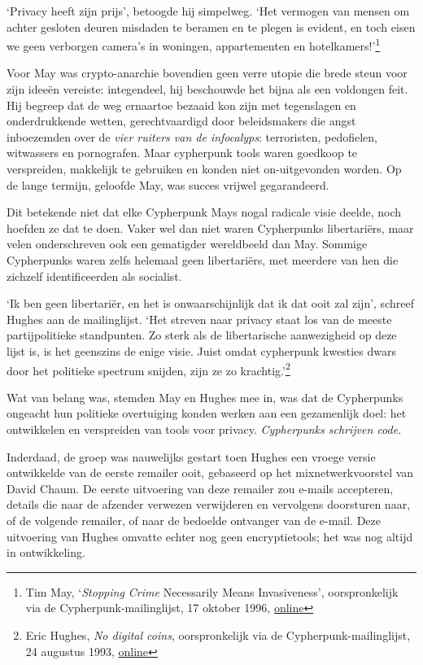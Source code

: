 \documentclass[
  a5paper,
  smalldemyvopaper,11pt,twoside,onecolumn,openright,extrafontsizes,
hidelinks]{memoir}
\begin{document}
`Privacy heeft zijn prijs', betoogde hij simpelweg. `Het vermogen van
mensen om achter gesloten deuren misdaden te beramen en te plegen is
evident, en toch eisen we geen verborgen camera's in woningen,
appartementen en hotelkamers!'\footnote{Tim May, `\emph{Stopping Crime}
  Necessarily Means Invasiveness', oorspronkelijk via de
  Cypherpunk-mailinglijst, 17 oktober 1996,
  \href{https://cypherpunks.venona.com/date/1996/10/msg01269.html}{online}}

Voor May was crypto-anarchie bovendien geen verre utopie die brede steun
voor zijn ideeën vereiste: integendeel, hij beschouwde het bijna als een
voldongen feit. Hij begreep dat de weg ernaartoe bezaaid kon zijn met
tegenslagen en onderdrukkende wetten, gerechtvaardigd door beleidsmakers
die angst inboezemden over de \emph{vier ruiters van de infocalyps}:
terroristen, pedofielen, witwassers en pornografen. Maar cypherpunk
tools waren goedkoop te verspreiden, makkelijk te gebruiken en konden
niet on-uitgevonden worden. Op de lange termijn, geloofde May, was
succes vrijwel gegarandeerd.

Dit betekende niet dat elke Cypherpunk Mays nogal radicale visie deelde,
noch hoefden ze dat te doen. Vaker wel dan niet waren Cypherpunks
libertariërs, maar velen onderschreven ook een gematigder wereldbeeld
dan May. Sommige Cypherpunks waren zelfs helemaal geen libertariërs, met
meerdere van hen die zichzelf identificeerden als socialist.

`Ik ben geen libertariër, en het is onwaarschijnlijk dat ik dat ooit zal
zijn', schreef Hughes aan de mailinglijst. `Het streven naar privacy
staat los van de meeste partijpolitieke standpunten. Zo sterk als de
libertarische aanwezigheid op deze lijst is, is het geenszins de enige
visie. Juist omdat cypherpunk kwesties dwars door het politieke spectrum
snijden, zijn ze zo krachtig.'\footnote{Eric Hughes, \emph{No digital
  coins}, oorspronkelijk via de Cypherpunk-mailinglijst, 24 augustus
  1993,
  \href{https://cypherpunks.venona.com/date/1993/08/msg00690.html}{online}}

Wat van belang was, stemden May en Hughes mee in, was dat de Cypherpunks
ongeacht hun politieke overtuiging konden werken aan een gezamenlijk
doel: het ontwikkelen en verspreiden van tools voor privacy.
\emph{Cypherpunks schrijven code}.

Inderdaad, de groep was nauwelijks gestart toen Hughes een vroege versie
ontwikkelde van de eerste remailer ooit, gebaseerd op het
mixnetwerkvoorstel van David Chaum. De eerste uitvoering van deze
remailer zou e-mails accepteren, details die naar de afzender verwezen
verwijderen en vervolgens doorsturen naar, of de volgende remailer, of
naar de bedoelde ontvanger van de e-mail. Deze uitvoering van Hughes
omvatte echter nog geen encryptietools; het was nog altijd in
ontwikkeling.
\end{document}
